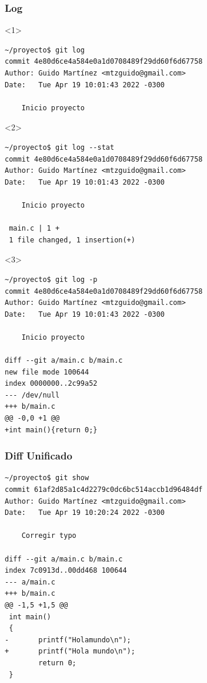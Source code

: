 \documentclass[a4paper, 12pt, aspectratio=169,
\ifhandout handout \else \fi
]{beamer}
\begin{document}
\begin{frame}[fragile]
    \frametitle{Log}
    \begin{onlyenv}<1>
        \begin{lstlisting}
~/proyecto$ git log
commit 4e80d6ce4a584e0a1d0708489f29dd60f6d67758
Author: Guido Martínez <mtzguido@gmail.com>
Date:   Tue Apr 19 10:01:43 2022 -0300

    Inicio proyecto
        \end{lstlisting}
    \end{onlyenv}
    \begin{onlyenv}<2>
        \begin{lstlisting}
~/proyecto$ git log --stat
commit 4e80d6ce4a584e0a1d0708489f29dd60f6d67758
Author: Guido Martínez <mtzguido@gmail.com>
Date:   Tue Apr 19 10:01:43 2022 -0300

    Inicio proyecto

 main.c | 1 +
 1 file changed, 1 insertion(+)
        \end{lstlisting}
    \end{onlyenv}
    \begin{onlyenv}<3>
        \begin{lstlisting}
~/proyecto$ git log -p
commit 4e80d6ce4a584e0a1d0708489f29dd60f6d67758
Author: Guido Martínez <mtzguido@gmail.com>
Date:   Tue Apr 19 10:01:43 2022 -0300

    Inicio proyecto

diff --git a/main.c b/main.c
new file mode 100644
index 0000000..2c99a52
--- /dev/null
+++ b/main.c
@@ -0,0 +1 @@
+int main(){return 0;}
        \end{lstlisting}
    \end{onlyenv}
\end{frame}

\begin{frame}[fragile]
    \frametitle{Diff Unificado}
    \begin{lstlisting}[basicstyle=\ttfamily\footnotesize]
~/proyecto$ git show
commit 61af2d85a1c4d2279c0dc6bc514accb1d96484df
Author: Guido Martínez <mtzguido@gmail.com>
Date:   Tue Apr 19 10:20:24 2022 -0300

    Corregir typo

diff --git a/main.c b/main.c
index 7c0913d..00dd468 100644
--- a/main.c
+++ b/main.c
@@ -1,5 +1,5 @@
 int main()
 {
-       printf("Holamundo\n");
+       printf("Hola mundo\n");
        return 0;
 }
\end{lstlisting}
\end{frame}
\end{document}
